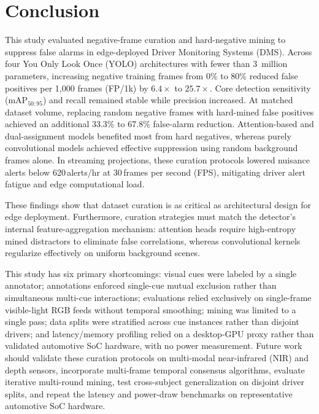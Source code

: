 \documentclass[conference]{IEEEtran}
\begin{document}
\section{Conclusion}
This study evaluated negative-frame curation and hard-negative mining to suppress false alarms in edge-deployed Driver Monitoring Systems (DMS). Across four You Only Look Once (YOLO) architectures with fewer than 3~million parameters, increasing negative training frames from 0\% to 80\% reduced false positives per 1{,}000 frames (FP/1k) by $6.4\times$ to $25.7\times$. Core detection sensitivity ($\text{mAP}_{50:95}$) and recall remained stable while precision increased. At matched dataset volume, replacing random negative frames with hard-mined false positives achieved an additional 33.3\% to 67.8\% false-alarm reduction. Attention-based and dual-assignment models benefited most from hard negatives, whereas purely convolutional models achieved effective suppression using random background frames alone. In streaming projections, these curation protocols lowered nuisance alerts below 620\,alerts/hr at 30\,frames per second (FPS), mitigating driver alert fatigue and edge computational load.

These findings show that dataset curation is as critical as architectural design for edge deployment. Furthermore, curation strategies must match the detector's internal feature-aggregation mechanism: attention heads require high-entropy mined distractors to eliminate false correlations, whereas convolutional kernels regularize effectively on uniform background scenes. 

This study has six primary shortcomings: visual cues were labeled by a single annotator; annotations enforced single-cue mutual exclusion rather than simultaneous multi-cue interactions; evaluations relied exclusively on single-frame visible-light RGB feeds without temporal smoothing; mining was limited to a single pass; data splits were stratified across cue instances rather than disjoint drivers; and latency/memory profiling relied on a desktop-GPU proxy rather than validated automotive SoC hardware, with no power measurement. Future work should validate these curation protocols on multi-modal near-infrared (NIR) and depth sensors, incorporate multi-frame temporal consensus algorithms, evaluate iterative multi-round mining, test cross-subject generalization on disjoint driver splits, and repeat the latency and power-draw benchmarks on representative automotive SoC hardware.
\end{document}
